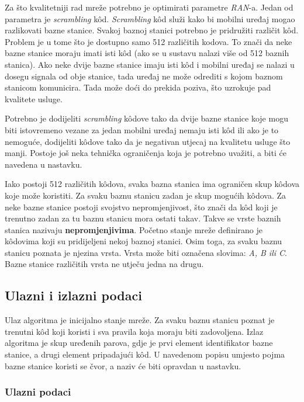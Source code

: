 \documentclass[times, utf8, diplomski, numeric]{fer}
\begin{document}
Za što kvalitetniji rad mreže potrebno je optimirati parametre \emph{RAN}-a. Jedan od parametra je \emph{scrambling} k\^{o}d. \emph{Scrambling} k\^{o}d služi kako bi mobilni uređaj mogao razlikovati bazne stanice. Svakoj baznoj stanici potrebno je pridružiti različit k\^{o}d. Problem je u tome što je dostupno samo 512 različitih kodova. To znači da neke bazne stanice moraju imati isti k\^{o}d (ako se u sustavu nalazi više od 512 baznih stanica). Ako neke dvije bazne stanice imaju isti k\^{o}d i mobilni uređaj se nalazi u dosegu signala od obje stanice, tada uređaj ne može odrediti s kojom baznom stanicom komunicira. Tada može doći do prekida poziva, što uzrokuje pad kvalitete usluge.

Potrebno je dodijeliti \emph{scrambling} k\^{o}dove tako da dvije bazne stanice koje mogu biti istovremeno vezane za jedan mobilni uređaj nemaju isti k\^{o}d ili ako je to nemoguće, dodijeliti k\^{o}dove tako da je negativan utjecaj na kvalitetu usluge što manji. Postoje još neka tehnička ograničenja koja je potrebno uvažiti, a biti će navedena u nastavku.

Iako postoji 512 različitih k\^{o}dova, svaka bazna stanica ima ograničen skup k\^{o}dova koje može koristiti. Za svaku baznu stanicu zadan je skup mogućih k\^{o}dova. Za neke bazne stanice postoji svojstvo nepromjenjivost, što znači da k\^{o}d koji je trenutno zadan za tu baznu stanicu mora ostati takav. Takve se vrste baznih stanica nazivaju \textbf{nepromjenjivima}. Početno stanje mreže definirano je k\^{o}dovima koji su pridijeljeni nekoj baznoj stanici. Osim toga, za svaku baznu stanicu poznata je njezina vrsta. Vrsta može biti označena slovima: \emph{A, B ili C}. Bazne stanice različitih vrsta ne utječu jedna na drugu.

\subsection{Ulazni i izlazni podaci}

Ulaz algoritma je inicijalno stanje mreže. Za svaku baznu stanicu poznat je trenutni k\^{o}d koji koristi i sva pravila koja moraju biti zadovoljena. Izlaz algoritma je skup uređenih parova, gdje je prvi element identifikator bazne stanice, a drugi element pripadajući k\^{o}d. U navedenom popisu umjesto pojma bazne stanice koristi se čvor, a naziv će biti opravdan u nastavku.

\subsubsection{Ulazni podaci}
\end{document}
